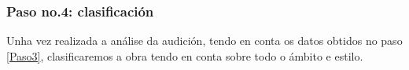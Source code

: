 \subsubsection*{Paso no.4: clasificación} \label{Clasificación-puer-natus}
Unha vez realizada a análise da audición, tendo en conta os datos obtidos no paso  \ref{Paso3}, clasificaremos a obra tendo en conta sobre todo o ámbito e estilo.
%
\vspace*{0.25cm}
\begin{ejercicio}
%
%
%
        \vspace*{2.78cm}
\end{ejercicio}

